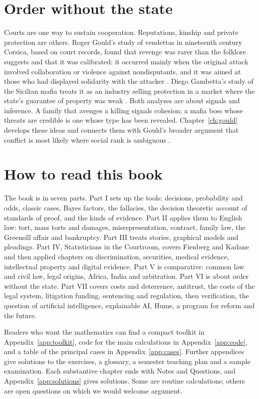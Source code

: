 \section{Order without the state}

Courts are one way to sustain cooperation. Reputations, kinship and private protection are others. Roger Gould's study of vendettas in nineteenth century Corsica, based on court records, found that revenge was rarer than the folklore suggests and that it was calibrated: it occurred mainly when the original attack involved collaboration or violence against nondisputants, and it was aimed at those who had displayed solidarity with the attacker \citep{gould2000}. Diego Gambetta's study of the Sicilian mafia treats it as an industry selling protection in a market where the state's guarantee of property was weak \citep{gambetta1993}. Both analyses are about signals and inference. A family that avenges a killing signals cohesion; a mafia boss whose threats are credible is one whose type has been revealed. Chapter~\ref{ch:gould} develops these ideas and connects them with Gould's broader argument that conflict is most likely where social rank is ambiguous \citep{gould2003}.

\section{How to read this book}

The book is in seven parts. Part I sets up the tools: decisions, probability and odds, classic cases, Bayes factors, the fallacies, the decision theoretic account of standards of proof, and the kinds of evidence. Part II applies them to English law: tort, mass torts and damages, misrepresentation, contract, family law, the Greensill affair and bankruptcy. Part III treats stories, graphical models and pleadings. Part IV, Statisticians in the Courtroom, covers Fienberg and Kadane and then applied chapters on discrimination, securities, medical evidence, intellectual property and digital evidence. Part V is comparative: common law and civil law, legal origins, Africa, India and arbitration. Part VI is about order without the state. Part VII covers costs and deterrence, antitrust, the costs of the legal system, litigation funding, sentencing and regulation, then verification, the question of artificial intelligence, explainable AI, Hume, a program for reform and the future.

Readers who want the mathematics can find a compact toolkit in Appendix~\ref{app:toolkit}, code for the main calculations in Appendix~\ref{app:code}, and a table of the principal cases in Appendix~\ref{app:cases}. Further appendices give solutions to the exercises, a glossary, a semester teaching plan and a sample examination. Each substantive chapter ends with Notes and Questions, and Appendix~\ref{app:solutions} gives solutions. Some are routine calculations; others are open questions on which we would welcome argument.

